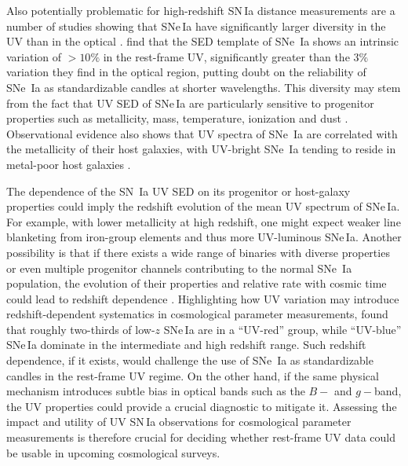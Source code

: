 \documentclass[twocolumn,tighten,times,floatfix]{aastex631}
\begin{document}
Also potentially problematic for high-redshift SN\,Ia distance measurements are a number of studies showing that SNe\,Ia have significantly larger diversity in the UV than in the optical \citep{Wang+12, milne13, foley13, foley16, Milne2015, Pan20, Nicolas21, Hoogendam24}. \cite{Foley08b} find that the SED template of SNe~Ia shows an intrinsic variation of $>10\%$ in the rest-frame UV, significantly greater than the $3\%$ variation they find in the optical region, putting doubt on the reliability of SNe~Ia as standardizable candles at shorter wavelengths. %
This diversity may stem from the fact that UV SED of SNe\,Ia are particularly sensitive to progenitor properties such as metallicity, mass, temperature, ionization and dust \citep{Hoflich98, Lentz00, Sauer08, Hachinger13, Mazzali14, Polin19}. Observational evidence also shows that UV spectra of SNe~Ia are correlated with the metallicity of their host galaxies, with UV-bright SNe~Ia tending to reside in metal-poor host galaxies \citep[][]{Pan20}.

The dependence of the SN~Ia UV SED on its progenitor or host-galaxy properties could imply the redshift evolution of the mean UV spectrum of SNe\,Ia. For example, with lower metallicity at high redshift, one might expect weaker line blanketing from iron-group elements and thus more UV-luminous SNe\,Ia.
Another possibility is that if there exists a wide range of binaries with diverse properties or even multiple progenitor channels contributing to the normal SNe~Ia population, the evolution of their properties and relative rate with cosmic time could lead to redshift dependence \citep[e.g.,][]{Rigault13,Childress14}.
Highlighting how UV variation may introduce redshift-dependent systematics in cosmological parameter measurements,
\cite{Milne2015} found that roughly two-thirds of low-$z$ SNe\,Ia are in a ``UV-red'' group, while ``UV-blue'' SNe\,Ia dominate in the intermediate and high redshift range.
Such redshift dependence, if it exists, would challenge the use of SNe~Ia as standardizable candles in the rest-frame UV regime. On the other hand, if the same physical mechanism introduces subtle bias in optical bands such as the $B-$ and $g-$band, the UV properties could provide a crucial diagnostic to mitigate it.
Assessing the impact and utility of UV SN\,Ia observations for cosmological parameter measurements is therefore crucial for deciding whether rest-frame UV data could be usable in upcoming cosmological surveys.
\end{document}
